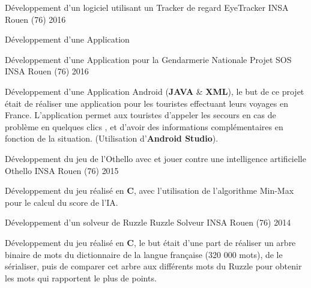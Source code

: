 

\begin{cventries}

  \cventry
	{Développement d'un logiciel utilisant un Tracker de regard} %
	{EyeTracker} %
	{INSA Rouen (76)} %
	{2016} %
	{
		\begin{cvitems} %
			\item {Développement d'une Application}
		\end{cvitems}
	}

  \cventry
	{Développement d'une Application pour la Gendarmerie Nationale} %
	{Projet SOS} %
	{INSA Rouen (76)} %
	{2016} %
	{
		\begin{cvitems} %
			\item {Développement d'une Application Android (\textbf{JAVA} \& \textbf{XML}), le but de ce projet était de réaliser une application pour les touristes effectuant leurs voyages en France. L'application permet aux touristes d'appeler les secours en cas de problème en quelques clics , et d'avoir des informations complémentaires en fonction de la situation. (Utilisation d'\textbf{Android Studio}). }
		\end{cvitems}
	}

  \cventry
	{Développement du jeu de l'Othello avec et jouer contre une intelligence artificielle} %
	{Othello} %
	{INSA Rouen (76)} %
	{2015} %
	{
		\begin{cvitems} %
			\item {Développement du jeu réalisé en \textbf{C}, avec l'utilisation de l'algorithme Min-Max pour le calcul du score de l'IA.}
		\end{cvitems}
	}

  \cventry
	{Développement d'un solveur de Ruzzle} %
	{Ruzzle Solveur} %
	{INSA Rouen (76)} %
	{2014} %
	{
		\begin{cvitems} %
			\item {Développement du jeu réalisé en \textbf{C}, le but était d'une part de réaliser un arbre binaire de mots du dictionnaire de la langue française (320 000 mots), de le sérialiser, puis de comparer cet arbre aux différents mots du Ruzzle pour obtenir les mots qui rapportent le plus de points.}
		\end{cvitems}
	}

\end{cventries}
